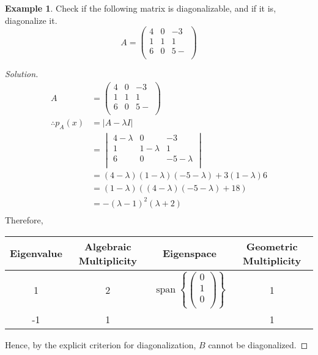 \documentclass[fleqn, a4paper, 12pt]{article}
\theoremstyle{definition}
\newtheorem{example}{Example}
\theoremstyle{theorem}
\newenvironment{solution}
{\begin{proof}[Solution]\let\qed\relax}
	{\end{proof}}
\DeclareMathOperator{\vspan}{\mathrm{span}} %
\begin{document}
\begin{example}
	Check if the following matrix is diagonalizable, and if it is, diagonalize it.
	\begin{equation*}
	A =
		\begin{pmatrix}
			4 & 0 & -3\\
			1 & 1 & 1\\
			6 & 0 & 5-\\
		\end{pmatrix}
	\end{equation*}
\end{example}

\begin{solution}
	\begin{align*}
		A &=
			\begin{pmatrix}
				4 & 0 & -3\\
				1 & 1 & 1\\
				6 & 0 & 5-\\
			\end{pmatrix}\\
			\therefore p_A(x) &= |A - \lambda I|\\
		&= 
		\begin{vmatrix}
			4 - \lambda & 0 & -3\\
			1 & 1 - \lambda & 1\\
			6 & 0 & -5 - \lambda\\
		\end{vmatrix}\\
		&= (4 - \lambda) (1 - \lambda) (-5 - \lambda) + 3 (1 - \lambda) 6\\
		&= (1 - \lambda) ((4 - \lambda)(-5 - \lambda) + 18)\\
		&= -(\lambda - 1)^2 (\lambda + 2)\\
	\end{align*}
		Therefore,\\
	\begin{tabular}{|c|c|c|c|}
		\hline
		Eigenvalue & Algebraic Multiplicity & Eigenspace & Geometric Multiplicity\\
		\hline
		1 & 2 & $\vspan
			\left\lbrace
				\begin{pmatrix}
					0\\
					1\\
					0\\
				\end{pmatrix}
			\right\rbrace
			$
		& 1\\
		\hline
		-1 & 1 & & 1\\ 
		\hline
	\end{tabular}
	Hence, by the explicit criterion for diagonalization, $B$ cannot be diagonalized.
\end{solution}
\end{document}
